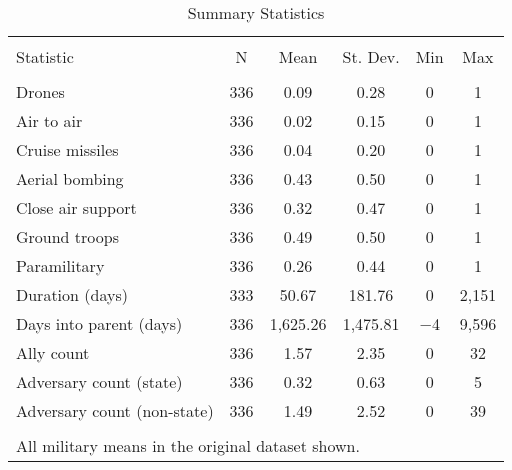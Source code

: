 \documentclass[fleqn,12pt]{article}
\begin{document}

\clearpage
\thispagestyle{empty}
\begin{table}[!htbp] \centering 
  \caption{Summary Statistics} 
  \label{tab:summary-stats} 
\begin{tabular}{@{\extracolsep{5pt}}lccccc} 
\\[-1.8ex]\hline 
\hline \\[-1.8ex] 
Statistic & \multicolumn{1}{c}{N} & \multicolumn{1}{c}{Mean} & \multicolumn{1}{c}{St. Dev.} & \multicolumn{1}{c}{Min} & \multicolumn{1}{c}{Max} \\ 
\hline \\[-1.8ex] 
Drones & 336 & 0.09 & 0.28 & 0 & 1 \\ 
Air to air & 336 & 0.02 & 0.15 & 0 & 1 \\ 
Cruise missiles & 336 & 0.04 & 0.20 & 0 & 1 \\ 
Aerial bombing & 336 & 0.43 & 0.50 & 0 & 1 \\ 
Close air support & 336 & 0.32 & 0.47 & 0 & 1 \\ 
Ground troops & 336 & 0.49 & 0.50 & 0 & 1 \\ 
Paramilitary & 336 & 0.26 & 0.44 & 0 & 1 \\ 
Duration (days) & 333 & 50.67 & 181.76 & 0 & 2,151 \\ 
Days into parent (days) & 336 & 1,625.26 & 1,475.81 & $-$4 & 9,596 \\ 
Ally count & 336 & 1.57 & 2.35 & 0 & 32 \\ 
Adversary count (state) & 336 & 0.32 & 0.63 & 0 & 5 \\ 
Adversary count (non-state) & 336 & 1.49 & 2.52 & 0 & 39 \\ 
\hline \\[-1.8ex] 
\multicolumn{6}{l}{All military means in the original dataset shown.} \\ 
\end{tabular} 
\end{table}



\end{document}
